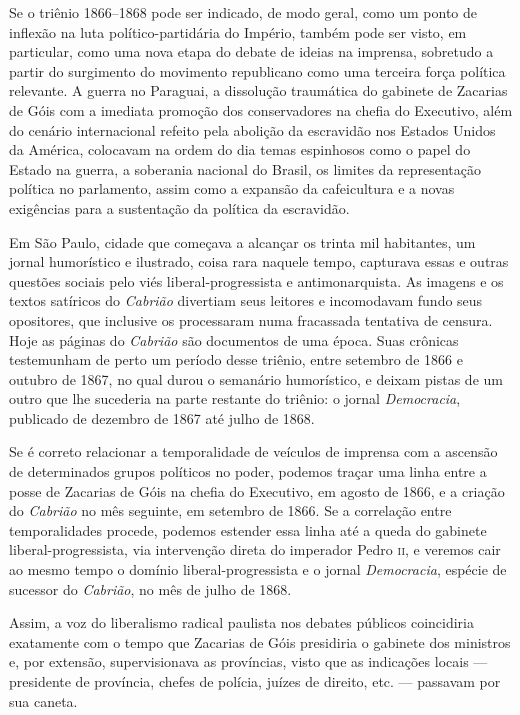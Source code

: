 Se o triênio 1866--1868 pode ser indicado, de modo geral, como um ponto
de inflexão na luta político-partidária do Império, também pode ser
visto, em particular, como uma nova etapa do debate de ideias na
imprensa, sobretudo a partir do surgimento do movimento republicano como
uma terceira força política relevante. A guerra no Paraguai, a
dissolução traumática do gabinete de Zacarias de Góis com a imediata
promoção dos conservadores na chefia do Executivo, além do cenário
internacional refeito pela abolição da escravidão nos Estados Unidos da
América, colocavam na ordem do dia temas espinhosos como o papel do
Estado na guerra, a soberania nacional do Brasil, os limites da
representação política no parlamento, assim como a expansão da
cafeicultura e a novas exigências para a sustentação da política da
escravidão.

Em São Paulo, cidade que começava a alcançar os trinta mil habitantes,
um jornal humorístico e ilustrado, coisa rara naquele tempo, capturava
essas e outras questões sociais pelo viés liberal-progressista e
antimonarquista. As imagens e os textos satíricos do \emph{Cabrião}
divertiam seus leitores e incomodavam fundo seus opositores, que
inclusive os processaram numa fracassada tentativa de censura. Hoje
as páginas do \emph{Cabrião} são documentos de uma época. Suas
crônicas testemunham de perto um período desse triênio, entre setembro de
1866 e outubro de 1867, no qual durou o semanário humorístico, e
deixam pistas de um outro que lhe sucederia na parte restante do
triênio: o jornal \emph{Democracia}, publicado de dezembro de 1867 até
julho de 1868.

Se é correto relacionar a temporalidade de veículos de imprensa com a
ascensão de determinados grupos políticos no poder, podemos traçar uma
linha entre a posse de Zacarias de Góis na chefia do Executivo, em
agosto de 1866, e a criação do \emph{Cabrião} no mês seguinte, em
setembro de 1866. Se a correlação entre temporalidades procede, podemos
estender essa linha até a queda do gabinete liberal-progressista, via
intervenção direta do imperador Pedro \textsc{ii}, e veremos cair ao mesmo tempo
o domínio liberal-progressista e o jornal \emph{Democracia}, espécie de
sucessor do \emph{Cabrião}, no mês de julho de 1868.

Assim, a voz do liberalismo radical paulista nos debates públicos
coincidiria exatamente com o tempo que Zacarias de Góis presidiria o
gabinete dos ministros e, por extensão, supervisionava as províncias,
visto que as indicações locais --- presidente de província, chefes de
polícia, juízes de direito, etc. --- passavam por sua caneta.

